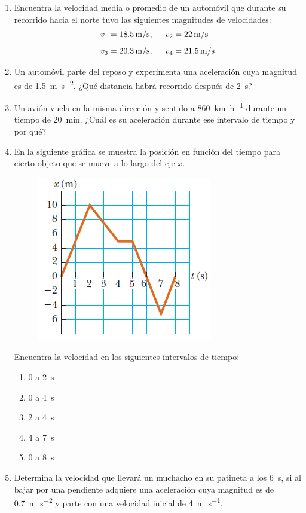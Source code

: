 \documentclass[14pt]{extarticle}
\begin{document}
\begin{enumerate}
\item Encuentra la velocidad media o promedio de un automóvil que durante su recorrido hacia el norte tuvo las
siguientes magnitudes de velocidades:
\begin{align*}
v_{1} &= \SI{18.5}{\meter\per\second}, \hspace{0.5cm} v_{2} = \SI{22}{\meter\per\second} \\[0.5em]
v_{3} &= \SI{20.3}{\meter\per\second}, \hspace{0.5cm} v_{4} = \SI{21.5}{\meter\per\second}
\end{align*}
\item Un automóvil parte del reposo y experimenta una aceleración cuya magnitud es de \SI{1.5}{\meter\per\square\second}. ¿Qué distancia habrá recorrido después de \SI{2}{\second}?
\item Un avión vuela en la misma dirección y sentido a \SI{860}{\kilo\meter\per\hour} durante un tiempo de \SI{20}{\minute}. ¿Cuál es su aceleración durante ese intervalo de tiempo y por qué?
\item En la siguiente gráfica se muestra la posición en función del tiempo para cierto objeto que se mueve a lo largo del eje $x$.
\begin{figure}[H]
    \centering
    \includegraphics[scale=1]{Imagenes/Ejercicio_Cuenta_01.png}
\end{figure}
Encuentra la velocidad en los siguientes intervalos de tiempo:
\begin{enumerate}[label=\alph*)]
\item \num{0} a \SI{2}{\second}
\item \num{0} a \SI{4}{\second}
\item \num{2} a \SI{4}{\second}
\item \num{4} a \SI{7}{\second}
\item \num{0} a \SI{8}{\second}
\end{enumerate}
\item Determina la velocidad que llevará un muchacho en su patineta a los \SI{6}{\second}, si al bajar por una pendiente adquiere una aceleración cuya magnitud es de \SI{0.7}{\meter\per\square\second} y parte con una velocidad inicial de \SI{4}{\meter\per\second}.
\end{enumerate}
\end{document}
